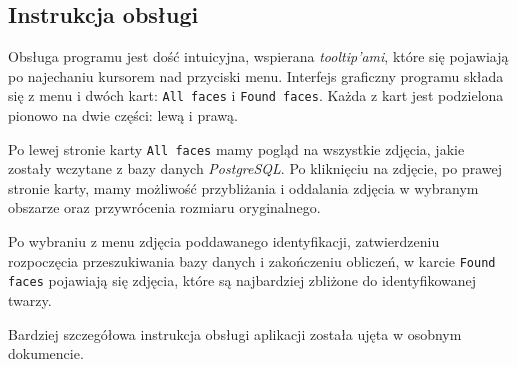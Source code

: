 \documentclass[a4paper,titlepage]{article}
\theoremstyle{break}
\numberwithin{equation}{subsection}
\begin{document}

\subsection{Instrukcja obsługi}

Obsługa programu jest dość intuicyjna, wspierana \emph{tooltip'ami}, które się pojawiają po najechaniu kursorem nad przyciski menu. Interfejs graficzny programu składa się z menu i dwóch kart: \texttt{All faces} i \texttt{Found faces}. Każda z  kart jest podzielona pionowo na dwie części: lewą i prawą.

Po lewej stronie karty \texttt{All~faces} mamy pogląd na wszystkie zdjęcia, jakie zostały wczytane z bazy danych \emph{PostgreSQL}. Po kliknięciu na zdjęcie, po prawej stronie karty, mamy możliwość przybliżania i oddalania zdjęcia w wybranym obszarze oraz przywrócenia rozmiaru oryginalnego.

Po wybraniu z menu zdjęcia poddawanego identyfikacji, zatwierdzeniu rozpoczęcia przeszukiwania bazy danych i zakończeniu obliczeń, w karcie \texttt{Found faces} pojawiają się zdjęcia, które są najbardziej zbliżone do identyfikowanej twarzy. %

Bardziej szczegółowa instrukcja obsługi aplikacji została ujęta w osobnym dokumencie.


\newpage
\end{document}
